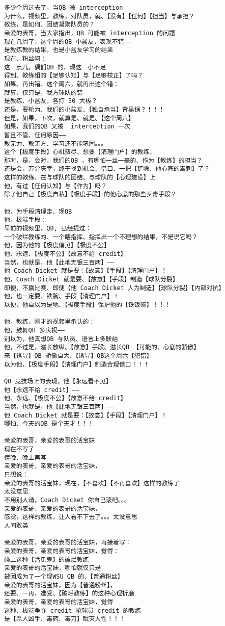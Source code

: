 \documentclass[9pt, b5paper]{article}
\begin{document}
\begin{verbatim}
多少个周过去了，当QB 被 interception
为什么，视频里，教练，对队员，就、【没有】【任何】【担当】与承担？
教练，是如何、团结凝聚队员的？
亲爱的表哥，当大家指出，QB 可能被 interception 的问题
现在几周了，这个周的QB 小盆友，表现不错——
是教练教的结果，也是小盆友学习的结果
现在、粉丝问：
这一点儿，偶们QB 的、现这一小不足
得到、教练组的【足够认知】与【足够校正】了吗？
如果、再出错、这个周六，就再出这个错：
就算，仅只是，我方球队的错
是教练、小盆友，各打 50 大板？
还是，要轮为、我们的小盆友、【独自承当】背黑锅？！！！
但是，如果，下次，就算是、就是、【这个周六】
如果，我们的QB 又被  interception 一次
暂且不管、任何原因——
教无力、教无方、学习还不能巩固。。。
这个【极度手段】心机费尽、想要【清理门户】的教练，
那时，是，会对，我们的QB ，有哪怕一丝一毫的、作为【教练】的担当？
还是会，万分庆幸，终于找到机会、借口、一把【铲除、他心底的毒刺】了？
这样的教练、在与球队的团结、与球队的【心理建设】上
他，有过【任何认知】与【作为】吗？
除了他自己【极度自私】【极度手段】的他心底的那些歹毒手段？

他，为手段清理走、现QB
他，极端手段：
早前的视频里，QB, 已经提过：
一个破烂教练的、一个瞎指挥、指挥出一个不理想的结果，不是说它吗？
他，因为他的【极度偏见】【极度不公】
他、永远、【极度不公】【故意不给 credit】
当然，也就是，他【此地无银三百两】——
他 Coach Dicket 就是要：【故意】【手段】【清理门户】！
他，Coach Dicket 就是要、【故意】【手段】制造【球队分裂】
即便，不赢比赛、即便【他 Coach Dicket 人为制造】【球队分裂】【内部对抗】
他，也一定要、铁腕、手段【清理门户】！
以便，他自以为是地、【极度手段】保护他的【铁饭碗】！！！

他，教练，刚才的视频里承认的：
他，鼓舞QB 多庆祝——
别以为，他真想QB 与队员、语言上多联结
他，不过是，滋长放纵、【故意】手段、滋长QB 【可能的、心底的骄傲】
来【诱导】QB 骄傲自大、【诱导】QB这个周六【犯错】
以为他，【极度手段】【清理门户】制造合理借口！！！

QB 竞技场上的表现，他【永远看不见】
他【永远不给 credit】——
他、永远、【极度不公】【故意不给 credit】
当然，也就是，他【此地无银三百两】——
他 Coach Dicket 就是要：【故意】【手段】【清理门户】！
哪怕、今天的QB 是个天才！！！

亲爱的表哥，亲爱的表哥的活宝妹
现在不写了
傍晚、晚上再写
亲爱的表哥，亲爱的表哥的活宝妹，
只想说：
亲爱的表哥的活宝妹，现在，【不喜欢】【不再喜欢】这样的教练了
太没意思
不用别人请，Coach Dicket 你自己滚吧。。。
亲爱的表哥，亲爱的表哥的活宝妹，
感觉，这样的教练，让人看不下去了。。。太没意思
人间败类

亲爱的表哥，亲爱的表哥的活宝妹，再接着写：
亲爱的表哥，亲爱的表哥的活宝妹，觉得：
碰上这种【活见鬼】的破烂教练
亲爱的表哥的活宝妹，哪怕就仅只是
被圈成为了一个现WSU QB 的、【普通粉丝】
亲爱的表哥的活宝妹，因为【普通粉丝】，
还要、一再、遭受、【破烂教练】的这种心理折磨
亲爱的表哥，亲爱的表哥的活宝妹，觉得
这种、极端争夺 credit 抢球员 credit 的教练
是【杀人凶手、毒药、毒刀】眠灭人性！！！


\end{verbatim}
\end{document}
